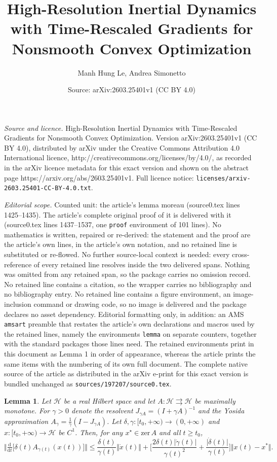 \documentclass[10pt,a4paper]{amsart}
\title{High-Resolution Inertial Dynamics with Time-Rescaled Gradients for Nonsmooth Convex Optimization}
\author{Manh Hung Le, Andrea Simonetto}
\date{Source: arXiv:2603.25401v1 (CC BY 4.0)}
\newtheorem{lemma}{Lemma}
\begin{document}
\maketitle

\noindent\emph{Source and licence.} High-Resolution Inertial Dynamics with Time-Rescaled Gradients for Nonsmooth Convex Optimization. Version arXiv:2603.25401v1 (CC BY 4.0), distributed by arXiv under the Creative Commons Attribution 4.0 International licence, http://creativecommons.org/licenses/by/4.0/, as recorded in the arXiv licence metadata for this exact version and shown on the abstract page https://arxiv.org/abs/2603.25401v1. Full licence notice: \texttt{licenses/arxiv-2603.25401-CC-BY-4.0.txt}.\par\smallskip

\noindent\textit{Editorial scope.} Counted unit: the article's lemma moreau (source0.tex lines 1425--1435). The article's complete original proof of it is delivered with it (source0.tex lines 1437--1537, one \texttt{proof} environment of 101 lines). No mathematics is written, repaired or re-derived: the statement and the proof are the article's own lines, in the article's own notation, and no retained line is substituted or re-flowed.  No further source-local context is needed: every cross-reference of every retained line resolves inside the two delivered spans.  Nothing was omitted from any retained span, so the package carries no omission record.  No retained line contains a citation, so the wrapper carries no bibliography and no bibliography entry.  No retained line contains a figure environment, an image-inclusion command or drawing code, so no image is delivered and the package declares no asset dependency.  Editorial formatting only, in addition: an AMS \texttt{amsart} preamble that restates the article's own declarations and macros used by the retained lines, namely the environments \texttt{lemma} on separate counters, together with the standard packages those lines need.  The retained environments print in this document as Lemma 1 in order of appearance, whereas the article prints the same items with the numbering of its own full document.  The complete native source of the article as distributed in the arXiv e-print for this exact version is bundled unchanged as \texttt{sources/197207/source0.tex}.
\begin{lemma}\label{lem:derivative of moreau}
Let $\mathcal H$ be a real Hilbert space and let $A:\mathcal H\rightrightarrows\mathcal H$ be maximally monotone.
For $\gamma>0$ denote the resolvent $J_{\gamma A}=(I+\gamma A)^{-1}$ and the Yosida approximation $A_\gamma=\frac{1}{\gamma}(I-J_{\gamma A})$.
Let $\delta,\gamma:[t_0,+\infty)\to(0,+\infty)$ and $x:[t_0,+\infty)\to\mathcal H$ be $C^1$. Then, for any $x^{\star}\in\mathrm{zer}\,A$ and all $t\ge t_0$,
\[
\Big\Vert \tfrac{\mathrm{d}}{\mathrm{d}t}\big[\delta(t)A_{\gamma(t)}(x(t))\big] \Big\Vert
\le \frac{\delta(t)}{\gamma(t)}\Vert \dot{x}(t) \Vert
+ \Big[\frac{2\delta(t)\vert \dot{\gamma}(t)\vert}{\gamma(t)^2}
+ \frac{\vert \dot{\delta}(t)\vert}{\gamma(t)}\Big]\Vert x(t)-x^* \Vert .
\]
\end{lemma}
\end{document}
